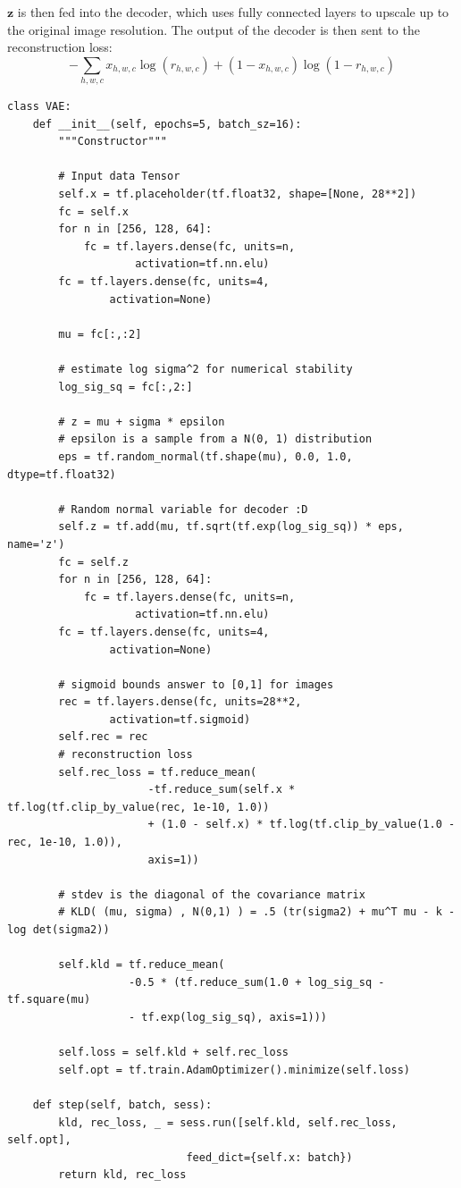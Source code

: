 \documentclass[10 pt]{article}
\begin{document}
$\mathbf{z}$ is then fed into the decoder, which uses fully connected layers to upscale
up to the original image resolution.
The output of the decoder is then sent to the reconstruction loss:
\begin{equation}
    -\sum_{h, w, c}x_{h,w,c} \log(r_{h,w,c}) + (1 - x_{h,w,c}) \log(1-r_{h,w,c})
\end{equation}
%


\begin{lstlisting}
class VAE:
    def __init__(self, epochs=5, batch_sz=16):
        """Constructor"""

        # Input data Tensor
        self.x = tf.placeholder(tf.float32, shape=[None, 28**2]) 
        fc = self.x
        for n in [256, 128, 64]:
            fc = tf.layers.dense(fc, units=n,
                    activation=tf.nn.elu)
        fc = tf.layers.dense(fc, units=4,
                activation=None)
        
        mu = fc[:,:2]

        # estimate log sigma^2 for numerical stability
        log_sig_sq = fc[:,2:]

        # z = mu + sigma * epsilon
        # epsilon is a sample from a N(0, 1) distribution
        eps = tf.random_normal(tf.shape(mu), 0.0, 1.0, dtype=tf.float32)

        # Random normal variable for decoder :D
        self.z = tf.add(mu, tf.sqrt(tf.exp(log_sig_sq)) * eps, name='z')
        fc = self.z
        for n in [256, 128, 64]:
            fc = tf.layers.dense(fc, units=n,
                    activation=tf.nn.elu)
        fc = tf.layers.dense(fc, units=4,
                activation=None)
        
        # sigmoid bounds answer to [0,1] for images
        rec = tf.layers.dense(fc, units=28**2,
                activation=tf.sigmoid)
        self.rec = rec
        # reconstruction loss
        self.rec_loss = tf.reduce_mean(
                      -tf.reduce_sum(self.x * tf.log(tf.clip_by_value(rec, 1e-10, 1.0))
                      + (1.0 - self.x) * tf.log(tf.clip_by_value(1.0 - rec, 1e-10, 1.0)),
                      axis=1))

        # stdev is the diagonal of the covariance matrix
        # KLD( (mu, sigma) , N(0,1) ) = .5 (tr(sigma2) + mu^T mu - k - log det(sigma2))

        self.kld = tf.reduce_mean(
                   -0.5 * (tf.reduce_sum(1.0 + log_sig_sq - tf.square(mu)
                   - tf.exp(log_sig_sq), axis=1)))

        self.loss = self.kld + self.rec_loss
        self.opt = tf.train.AdamOptimizer().minimize(self.loss)

    def step(self, batch, sess):
        kld, rec_loss, _ = sess.run([self.kld, self.rec_loss, self.opt],
                            feed_dict={self.x: batch})
        return kld, rec_loss
\end{lstlisting}
\end{document}
